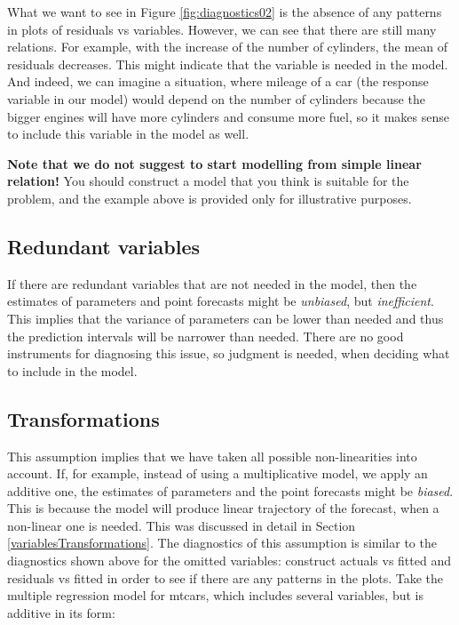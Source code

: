 \documentclass[
]{book}
\theoremstyle{definition}
\theoremstyle{definition}
\theoremstyle{definition}
\theoremstyle{definition}
\theoremstyle{remark}
\begin{document}
What we want to see in Figure \ref{fig:diagnostics02} is the absence of any patterns in plots of residuals vs variables. However, we can see that there are still many relations. For example, with the increase of the number of cylinders, the mean of residuals decreases. This might indicate that the variable is needed in the model. And indeed, we can imagine a situation, where mileage of a car (the response variable in our model) would depend on the number of cylinders because the bigger engines will have more cylinders and consume more fuel, so it makes sense to include this variable in the model as well.

\textbf{Note that we do not suggest to start modelling from simple linear relation!} You should construct a model that you think is suitable for the problem, and the example above is provided only for illustrative purposes.

\hypertarget{assumptionsCorrectModelRedundant}{%
\subsection{Redundant variables}\label{assumptionsCorrectModelRedundant}}

If there are redundant variables that are not needed in the model, then the estimates of parameters and point forecasts might be \emph{unbiased}, but \emph{inefficient}. This implies that the variance of parameters can be lower than needed and thus the prediction intervals will be narrower than needed. There are no good instruments for diagnosing this issue, so judgment is needed, when deciding what to include in the model.

\hypertarget{assumptionsCorrectModelTransformations}{%
\subsection{Transformations}\label{assumptionsCorrectModelTransformations}}

This assumption implies that we have taken all possible non-linearities into account. If, for example, instead of using a multiplicative model, we apply an additive one, the estimates of parameters and the point forecasts might be \emph{biased}. This is because the model will produce linear trajectory of the forecast, when a non-linear one is needed. This was discussed in detail in Section \ref{variablesTransformations}. The diagnostics of this assumption is similar to the diagnostics shown above for the omitted variables: construct actuals vs fitted and residuals vs fitted in order to see if there are any patterns in the plots. Take the multiple regression model for mtcars, which includes several variables, but is additive in its form:
\end{document}
